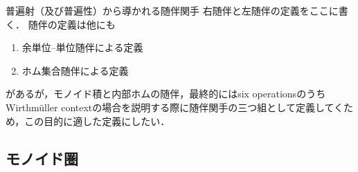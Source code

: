 \documentclass[type_judgement.tex]{subfiles}
\begin{document}
\begin{defn}[Category（圏）]


\begin{defn}[Adjunction（随伴）]
普遍射（及び普遍性）から導かれる随伴関手
右随伴と左随伴の定義をここに書く．
随伴の定義は他にも
\begin{enumerate}
    \item 余単位--単位随伴による定義
    \item ホム集合随伴による定義
\end{enumerate}
があるが，モノイド積と内部ホムの随伴，最終的にはsix operationsのうちWirthmüller contextの場合を説明する際に随伴関手の三つ組として定義してくため，この目的に適した定義にしたい．
\end{defn}

\begin{defn}

\end{defn}

\subsection{モノイド圏}
\end{defn}
\end{document}
